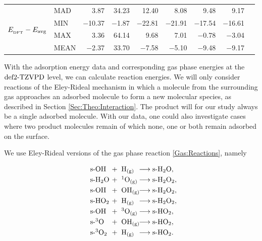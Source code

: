 \documentclass[8.5pt,twoside,twocolumn]{article}
\newcommand\zpe{\enmat{\te{ZPE}}}
\newcommand\dft{\enmat{_{\te{DFT}}}}
\newcommand\sur{\enmat{\te{s-}}}
\newcommand\gas{\enmat{_\te{(g)}}}
\newcommand\singo{\enmat{{^1\te{O}}}}
\newcommand\tripo{\enmat{{^3\te{O}}}}
\newcommand\tripot{\enmat{{^3\ot}}}
\newcommand{\fakefna}{\enmat{^a}}
\newcommand\kmo{\enmat{\te {kJ/mol}}}
\theoremstyle{standard}
\begin{document}
\begin{table}[htb]
\begin{tabular}{lll|rrrrrr|r}
    \hline \hline
\multicolumn{2}{r|}{\multirow{4}{*}{$E_{\dft} - \avg$}} &
       MAD   &     3.87  & 34.23 & 12.40 & 8.08  & 9.48  & 9.17  & \\
 \multicolumn{2}{r|}{} & MIN   & $-$10.37 & $-$1.87 & $-$22.81 & $-$21.91 & $-$17.54 & $-$16.61  & \\
 \multicolumn{2}{r|}{} & MAX   & 3.36  & 64.14 & 9.68  & 7.01  & $-$0.78 & $-$3.04 & \\
 \multicolumn{2}{r|}{} & MEAN  & $-$2.37 & 33.70 & $-$7.58 & $-$5.10 & $-$9.48 & $-$9.17  &  \\[2pt]
    \end{tabular}%
  \label{Tab:Ads:React}%
\end{table}%


With the adsorption energy data and corresponding gas phase energies at the
$\text{def2-TZVPD}$ level, we can calculate reaction energies. We will only
consider reactions of the Eley-Rideal mechanism in which a molecule
from the surrounding gas approaches an adsorbed molecule to form
a new molecular species, as described in Section \ref{Sec:Theo:Interaction}.
The product will for our study always be a single adsorbed molecule. With our data,
one could also investigate cases where two product molecules remain
of which none, one or both remain adsorbed on the surface.

We use Eley-Rideal versions of the gas phase reaction \eqref{Gas:Reactions}, namely

\renewcommand\ronebox[1]{\makebox[1cm][l]{\enmat{#1}}}
\renewcommand\rtwobox[1]{\makebox[1.cm][l]{\ \enmat{#1}}}
\renewcommand\prodbox[1]{\makebox[1.65cm][l]{\enmat{#1}}}
\begin{subequations}
\begin{align}
   \label{Surf:HO+H->H2O}
   \ronebox{\sur\ho}+\rtwobox{\te{H}\gas}\prodbox{\chemar\sur\hto,} \\ 
   \label{Surf:H2O+O->H2O2}
   \ronebox{\sur\hto}+\rtwobox{\singo\gas}\prodbox{\chemar\sur\htot,} \\
   \label{Surf:HO+HO->H2O2}
   \ronebox{\sur\ho}+\rtwobox{\ho\gas}\prodbox{\chemar\sur\htot,} \\
   \label{Surf:HO2+H->H2O2}
   \ronebox{\sur\hot}+\rtwobox{\te{H}\gas}\prodbox{\chemar\sur\htot,} \\
   \label{Surf:HO+O->HO2}
   \ronebox{\sur\ho}+\rtwobox{\tripo\gas}\prodbox{\chemar\sur\hot,} \\
   \label{Surf:O+HO->HO2}
   \ronebox{\sur\tripo}+\rtwobox{\ho\gas}\prodbox{\chemar\sur\hot,} \\
   \label{Surf:3O2+H->HO2}
   \ronebox{\sur\tripot}+\rtwobox{\te{H}\gas}\prodbox{\chemar\sur\hot.}
\end{align}
\label{Surf:Reactions}
\end{subequations}
\end{document}
